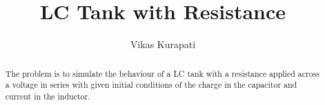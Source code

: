 \documentclass[12pt, a4paper]{report}
\title{\textbf{LC Tank with Resistance}}
\author{Vikas Kurapati}
\affil{Roll No. : 130010058}
\begin{document}
\maketitle
\newpage
\tableofcontents
\begin{abstract}
 The problem is to simulate the behaviour of a LC tank with a resistance applied across a voltage in series with given initial conditions of the charge in the capacitor and current in the inductor.
\end{abstract}

\begin{Section}
 
\end{Section}
\end{document}
